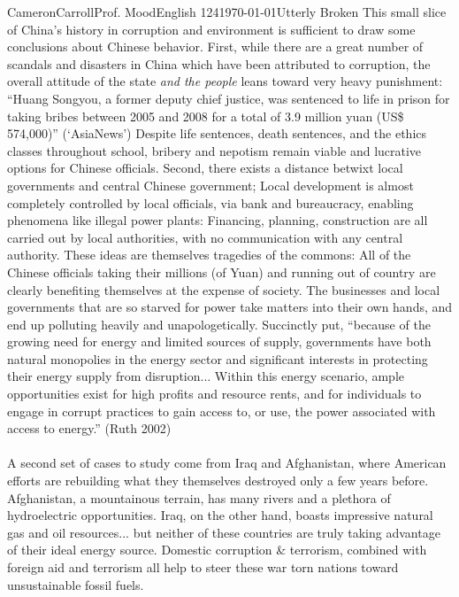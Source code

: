 \begin{mla}{Cameron}{Carroll}{Prof. Mood}{English 124}{\today}{Utterly Broken}
This small slice of China's history in corruption and environment is sufficient to draw some conclusions about Chinese behavior. First, while there are a great number of scandals and disasters in China which have been attributed to corruption, the overall attitude of the state \emph{and the people} leans toward very heavy punishment: ``Huang Songyou, a former deputy chief justice, was sentenced to life in prison for taking bribes between 2005 and 2008 for a total of 3.9 million yuan (US\$ 574,000)'' (`AsiaNews') Despite life sentences, death sentences, and the ethics classes throughout school, bribery and nepotism remain viable and lucrative options for Chinese officials. Second, there exists a distance betwixt local governments and central Chinese government; Local development is almost completely controlled by local officials, via bank and bureaucracy, enabling phenomena like illegal power plants: Financing, planning, construction are all carried out by local authorities, with no communication with any central authority. These ideas are themselves tragedies of the commons: All of the Chinese officials taking their millions (of Yuan) and running out of country are clearly benefiting themselves at the expense of society. The businesses and local governments that are so starved for power take matters into their own hands, and end up polluting heavily and unapologetically. Succinctly put, ``because of the growing need for energy and limited sources of supply, governments have both natural monopolies in the energy sector and significant interests in protecting their energy supply from disruption... Within this energy scenario, ample opportunities exist for high profits and resource rents, and for individuals to engage in corrupt practices to gain access to, or use, the power associated with access to energy.'' (Ruth 2002)

\vspace{5mm}

\paragraph{} A second set of cases to study come from Iraq and Afghanistan, where American efforts are rebuilding what they themselves destroyed only a few years before. Afghanistan, a mountainous terrain, has many rivers and a plethora of hydroelectric opportunities. Iraq, on the other hand, boasts impressive natural gas and oil resources... but neither of these countries are truly taking advantage of their ideal energy source. Domestic corruption \& terrorism, combined with foreign aid and terrorism all help to steer these war torn nations toward unsustainable fossil fuels.


\end{mla}
